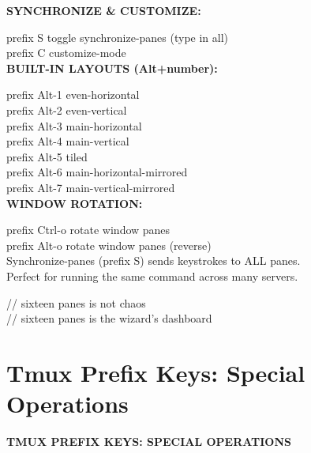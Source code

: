 \documentclass[11pt,a4paper,twoside]{book}
\begin{document}
\vspace{12pt}
{\bfseries\color{neonyellow} SYNCHRONIZE \& CUSTOMIZE:}\vspace{4pt}

prefix S              toggle synchronize-panes (type in all)\\
prefix C              customize-mode\\


\vspace{12pt}
{\bfseries\color{neonyellow} BUILT-IN LAYOUTS (Alt+number):}\vspace{4pt}

prefix Alt-1          even-horizontal\\
prefix Alt-2          even-vertical\\
prefix Alt-3          main-horizontal\\
prefix Alt-4          main-vertical\\
prefix Alt-5          tiled\\
prefix Alt-6          main-horizontal-mirrored\\
prefix Alt-7          main-vertical-mirrored\\


\vspace{12pt}
{\bfseries\color{neonyellow} WINDOW ROTATION:}\vspace{4pt}

prefix Ctrl-o         rotate window panes\\
prefix Alt-o          rotate window panes (reverse)\\

Synchronize-panes (prefix S) sends keystrokes to ALL panes.\\
Perfect for running the same command across many servers.\\

\begin{codebox}
\color{neongreen}// sixteen panes is not chaos\\
\color{neongreen}// sixteen panes is the wizard's dashboard\\
\end{codebox}


\vspace{16pt}

\section{Tmux Prefix Keys: Special Operations}


\vspace{10pt}
{\large\bfseries\color{neoncyan} TMUX PREFIX KEYS: SPECIAL OPERATIONS}\vspace{6pt}
\end{document}

